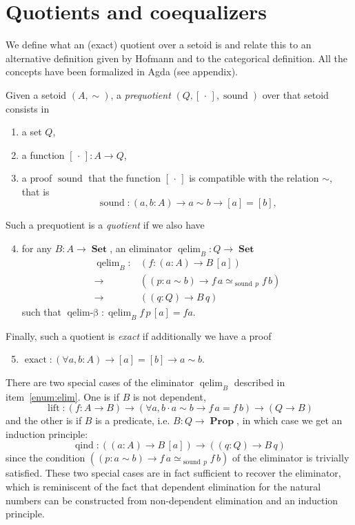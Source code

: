 \documentclass[envcountsame]{llncs}
\newcommand{\dotph}{\,\cdot\,} %
\providecommand{\class}[1]{[#1]}
\DeclareMathOperator{\Prop}{\mathbf{Prop}}
\DeclareMathOperator{\Set}{\mathbf{Set}}
\DeclareMathOperator{\sound}{sound}
\DeclareMathOperator{\qelimbeta}{qelim-\beta}
\DeclareMathOperator{\qind}{qind}
\DeclareMathOperator{\exact}{exact}
\DeclareMathOperator{\qelim}{qelim}
\DeclareMathOperator{\lift}{lift}
\renewcommand{\equiv}{=}
\begin{document}
\section{Quotients and coequalizers}\label{sec:quotients}

We define what an (exact) quotient over a setoid is and relate this to
an alternative definition given by Hofmann and to the categorical
definition. All the concepts have been formalized in Agda (see appendix).

\begin{definition}
\label{def:quotient}

\noindent
Given a setoid $(A,\sim)$,  a \emph{prequotient} $(Q,\class\dotph,\sound)$ over that setoid consists in
\begin{enumerate}
\item \label{enum:Q} a set $Q$,
\item \label{enum:box}a function $\class\dotph\colon A \to Q$,
\item \label{enum:sound} a proof $\sound$ that  the function $\class\dotph$ is compatible with the relation $\sim$,
that is \[\sound\colon (a,b : A) \to a\sim b \to [a] = [b],\]
\end{enumerate}
Such a prequotient is a \emph{quotient} if  we also have\begin{enumerate}
\setcounter{enumi}{3}
\item \label{enum:elim}
for any $B\colon A\to\Set$, an eliminator $\qelim_B: Q\to\Set$
 \begin{align*}
 \qelim_B\colon &(f\colon (a:A) \to B\,\class a) \\
        {\to}\, &((p:a\sim b) \to f\,a \simeq_{\sound\,p}f\,b)\\
        {\to}\, &((q:Q) \to B\,q)
 \end{align*}
such that $\qelimbeta\colon \qelim_B f \,p\,\class a\equiv f a$.

\end{enumerate}
Finally, such a quotient is \emph{exact} if additionally
we have
a proof\begin{enumerate}
\setcounter{enumi}{4}
\item $\exact :(\forall a,b : A) \to  \class a \equiv \class b \to a \sim b$.

\end{enumerate}
\end{definition}

There are two special cases of the eliminator $\qelim_B$ described in item~\ref{enum:elim}. One is if $B$ is not dependent,
 \[\lift\colon (f\colon A \to B) \to (\forall a,b\cdot a\sim b \to f\,a \equiv f\,b) \to (Q \to B)\]
and the other is if $B$ is a predicate, i.e. $B : Q\to \Prop$, in which case we get an induction principle:
\[\qind \colon((a: A)\to B \,\class a)\to ((q : Q)\to B\,q)\]
since the condition $((p:a\sim b) \to f\,a \simeq_{\sound\,p}f\,b) $  of  the eliminator is trivially satisfied.
These two special cases are in fact sufficient to recover the eliminator, which is reminiscent of the fact that dependent elimination for the natural numbers can be constructed from non-dependent elimination and an induction principle.
\end{document}
